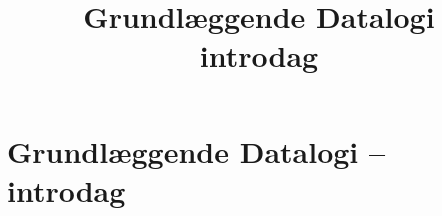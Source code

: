 \documentclass[10pt]{article}
\title{Grundlæggende Datalogi \\ introdag}
\author{
}
\begin{document}
\section*{Grundlæggende Datalogi -- introdag}
\end{document}
